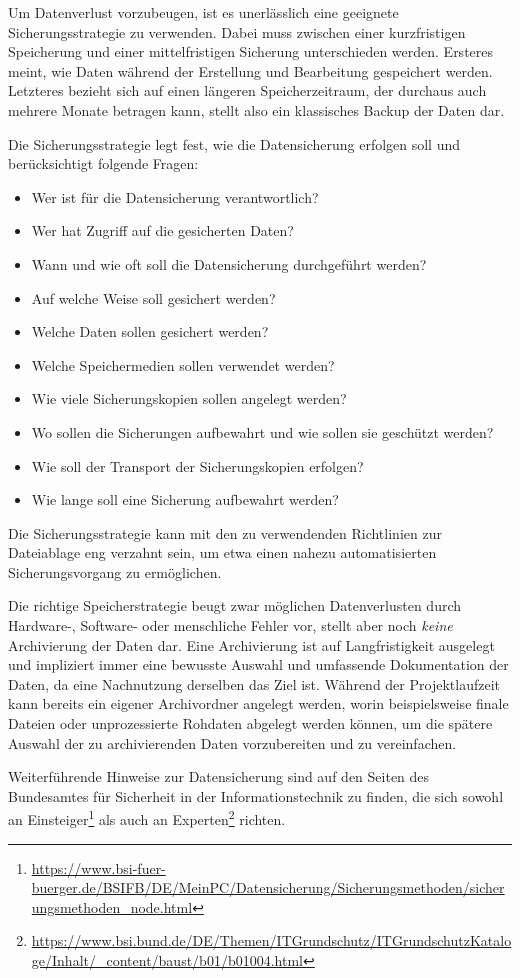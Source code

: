 Um Datenverlust vorzubeugen, ist es unerlässlich eine geeignete Sicherungsstrategie zu verwenden. Dabei muss zwischen einer kurzfristigen Speicherung und einer mittelfristigen Sicherung unterschieden werden. Ersteres meint, wie Daten während der Erstellung und Bearbeitung gespeichert werden. Letzteres bezieht sich auf einen längeren Speicherzeitraum, der durchaus auch mehrere Monate betragen kann, stellt also ein klassisches Backup der Daten dar.

Die Sicherungsstrategie legt fest, wie die Datensicherung erfolgen soll und berücksichtigt folgende Fragen:
\begin{itemize}
	\item Wer ist für die Datensicherung verantwortlich?
	\item Wer hat Zugriff auf die gesicherten Daten?
	\item Wann und wie oft soll die Datensicherung durchgeführt werden?
	\item Auf welche Weise soll gesichert werden?
	\item Welche Daten sollen gesichert werden?
	\item Welche Speichermedien sollen verwendet werden?
	\item Wie viele Sicherungskopien sollen angelegt werden?
	\item Wo sollen die Sicherungen aufbewahrt und wie sollen sie geschützt werden?
	\item Wie soll der Transport der Sicherungskopien erfolgen?
	\item Wie lange soll eine Sicherung aufbewahrt werden?
\end{itemize}

Die Sicherungsstrategie kann mit den zu verwendenden Richtlinien zur Dateiablage eng verzahnt sein, um etwa einen nahezu automatisierten Sicherungsvorgang zu ermöglichen.

Die richtige Speicherstrategie beugt zwar möglichen Datenverlusten durch Hardware-, Software- oder menschliche Fehler vor, stellt aber noch \emph{keine} Archivierung der Daten dar. Eine Archivierung ist auf Langfristigkeit ausgelegt und impliziert immer eine bewusste Auswahl und umfassende Dokumentation der Daten, da eine Nachnutzung derselben das Ziel ist. Während der Projektlaufzeit kann bereits ein eigener Archivordner angelegt werden, worin beispielsweise finale Dateien oder unprozessierte Rohdaten abgelegt werden können, um die spätere Auswahl der zu archivierenden Daten vorzubereiten und zu vereinfachen.

Weiterführende Hinweise zur Datensicherung sind auf den Seiten des Bundesamtes für Sicherheit in der Informationstechnik zu finden, die sich sowohl an Einsteiger\footnote{\url{https://www.bsi-fuer-buerger.de/BSIFB/DE/MeinPC/Datensicherung/Sicherungsmethoden/sicherungsmethoden\_node.html}} als auch an Experten\footnote{\url{https://www.bsi.bund.de/DE/Themen/ITGrundschutz/ITGrundschutzKataloge/Inhalt/\_content/baust/b01/b01004.html}} richten. 